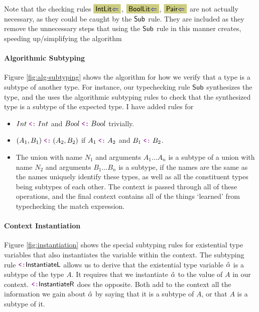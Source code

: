 Note that the checking rules $\MyTCRule{\Intcheckrulename}$, $\MyTCRule{\Boolcheckrulename}$, $\MyTCRule{\Paircheckrulename}$ are not actually necessary, as they could be caught by the $\text{\normalfont\textsf{Sub}}$ rule. They are included as they remove the unnecessary steps that using the $\text{\normalfont\textsf{Sub}}$ rule in this manner creates, speeding up/simplifying the algorithm

\newpage

\newpage
% 

\paragraph{Algorithmic Subtyping} Figure \ref{fig:alg-subtyping} shows the algorithm for how we verify that a type is a subtype of another type. For instance, our typechecking rule $\text{\normalfont\textsf{Sub}}$ synthesizes the type, and the uses the algorithmic subtyping rules to check that the synthesized type is a subtype of the expected type. I have added rules for
\begin{itemize}
    \item $Int \subtype Int$ and $Bool \subtype Bool$ trivially. 
    \item $(A_1, B_1) \subtype (A_2, B_2)$ if $A_1 \subtype A_2$ and $B_1 \subtype B_2$.
    \item The union with name $N_1$ and arguments $A_1 \dots A_n$ is a subtype of a union with name $N_2$ and arguments $B_1 \dots B_n$ is a subtype, if the names are the same as the names uniquely identify these types, as well as all the constituent types being subtypes of each other. The context is passed through all of these operations, and the final context contains all of the things `learned' from typechecking the match expression.
\end{itemize}

\paragraph{Context Instantiation} 
Figure \ref{fig:instantiation} shows the special subtyping rules for existential type variables that also instantiates the variable within the context. The subtyping rule $\SubInstL$ allows us to derive that the existential type variable $\hat{\alpha}$ is a subtype of the type $A$. It requires that we instantiate $\hat{\alpha}$ to the value of $A$ in our context. $\SubInstR$ does the opposite. Both add to the context all the information we gain about $\hat{\alpha}$ by saying that it is a subtype of $A$, or that $A$ is a subtype of it. 

